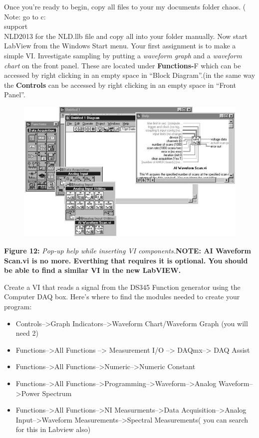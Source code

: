 \documentclass{../lab}
\begin{document}
Once you're ready to begin, copy all files to your my documents folder chaos. ( Note: go to c:\\support\\NLD2013 for the NLD.llb file and copy all into your folder manually. Now start LabView from the Windows Start menu. Your first assignment is to make a simple VI. Investigate sampling by putting a \emph{waveform graph} and a \emph{waveform chart} on the front panel. These are located under \textbf{Functions-}F which can be accessed by right clicking in an empty space in ``Block Diagram''.(in the same way the \textbf{Controls} can be accessed by right clicking in an empty space in ``Front Panel''.


\begin{figure}[h]
    \centering
    \href{http://experimentationlab.berkeley.edu/sites/default/files/images/Nldimage067.jpg}{\includegraphics[width=0.5\linewidth]{images/Nldimage067.jpg}}
    \caption{}
    \label{fig:Nldimage067}
\end{figure}

\textbf{Figure 12:} \emph{Pop-up help while inserting VI components.}\textbf{NOTE: AI Waveform Scan.vi is no more. Everthing that requires it is optional. You should be able to find a similar VI in the new LabVIEW.}

Create a VI that reads a signal from the DS345 Function generator using the Computer DAQ box. Here's where to find the modules needed to create your program:

\begin{itemize}
    \item Controls-->Graph Indicators-->Waveform Chart/Waveform Graph (you will need 2)

    \item Functions-->All Functions --> Measurement I/O --> DAQmx--> DAQ Assist

    \item Functions-->All Functions-->Numeric-->Numeric Constant

    \item Functions-->All Functions-->Programming-->Waveform-->Analog Waveform-->Power Spectrum

    \item Functions-->All Functions-->NI Measurments-->Data Acquisition-->Analog Input-->Waveform Measurements-->Spectral Measurements( you can search for this in Labview also)

\end{itemize}
\end{document}
